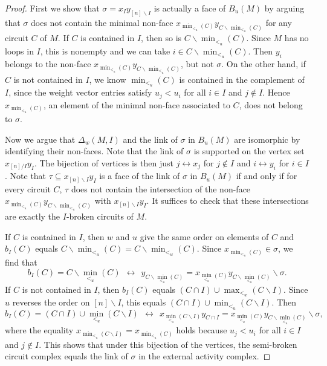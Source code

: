 \documentclass[ALCO,ThmDefs,Unicode,epreuves]{cedram}
\begin{document}
\begin{proof}
First we show that $\sigma = x_Iy_{[n]\backslash I}$ is
actually a face of $B_u(M)$ by arguing that $\sigma$ does not contain the minimal
non-face $x_{\min_{<_u}(C)}y_{C\backslash \min_{<_u}(C)}$ for any
circuit $C$ of $M$.
If $C$ is contained in $I$, then so is
$C\backslash \min_{<_u}(C)$. 
Since $M$ has no loops in $I$, this is nonempty and we can take $i\in C\backslash \min_{<_u}(C)$.
Then $y_i$ belongs to the non-face $x_{\min_{<_u}(C)}y_{C\backslash \min_{<_u}(C)}$, but not $\sigma$. 
On the other hand, if $C$ is not contained in $I$, we know $\min_{<_u}(C)$ is
contained in the complement of $I$, since the weight vector entries
satisfy $u_j<u_i$ for all $i\in I$ and $j\not\in I$.
Hence $x_{\min_{<_u}(C)}$, an element of the minimal
non-face associated to $C$, does not belong to
$\sigma$.

Now we argue that $\Delta_w(M,I)$ and the link of $\sigma$ in $B_u(M)$ are isomorphic by 
identifying their non-faces. Note that the link of $\sigma$ is supported on the vertex set 
$x_{[n]/I}y_I$. The bijection of vertices is then just $j\leftrightarrow x_j$ for $j\not\in I$ and $i \leftrightarrow y_i$ for $i\in I$. Note that $\tau\subseteq x_{[n]\backslash I}y_{I}$ is a face of the link 
of $\sigma$ in $B_u(M)$ if and only if for every circuit $C$, $\tau$ does not contain the intersection 
of the non-face $x_{\min_{<_u}(C)}y_{C\backslash \min_{<_u}(C)}$ with $x_{[n]\backslash I}y_{I}$. 
It suffices to check that these intersections are exactly the $I$-broken circuits of $M$. 

If $C$ is contained in $I$, then $w$ and $u$ give the same order on elements of $C$ and 
 $b_I(C)$ equals $ C\backslash\min_{<_u}(C)= C\backslash\min_{<_w}(C)$. Since $x_{\min_{<_u}(C)}\in \sigma$, we find that 
 \[ 
 b_I(C) = \textstyle{C\backslash\min_{<_u}(C)} \ \ \leftrightarrow \ \ y_{C\backslash\min_{<_u}(C)} = x_{\min_{<_u}(C)}y_{C\backslash\min_{<_u}(C)} \backslash \sigma.
 \]
If $C$ is not contained in $I$, then $b_I(C)$ equals $(C\cap I) \cup \max_{<_w}(C\backslash I)$. 
Since $u$ reverses the order on $[n]\backslash I$, this equals
$(C\cap I) \cup \min_{<_u}(C\backslash I)$. Then 
 \[ 
 b_I(C) = \textstyle{(C\cap I) \cup \min_{<_u}(C\backslash I)} \ \ \leftrightarrow \ \ x_{\min_{<_u}(C\backslash I)}y_{C\cap I} = x_{\min_{<_u}(C)}y_{C\backslash\min_{<_u}(C)} \backslash \sigma,
 \]
where the equality $x_{\min_{<_u}(C\backslash I)} = x_{\min_{<_u}(C)}$ holds because 
$u_j < u_i$ for all $i\in I$ and $j\not\in I$. 
This shows that under this bijection of the vertices, the semi-broken circuit complex equals the link of $\sigma$ in the external activity complex.
\end{proof}
\end{document}
